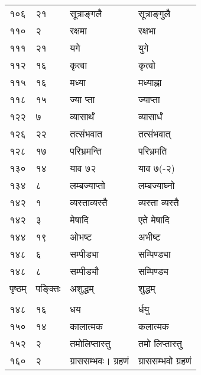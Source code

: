 \documentclass[11pt, openany]{book}
\begin{document}
\begin{longtable}{p{1cm} p{1.5cm} p{4cm} p{4cm}}
 १०६ & २१ & सूत्राङ्गलै & सूत्राङ्गुलै\\

 ११० & २ & रक्षमा & रक्षभा\\

 १११ & २१ & यगे & युगे \\

 ११२ & १६ & कृत्वा & कृत्वो\\

 ११५ & १६ & मध्या & मध्याह्ना\\

 ११८ & १५ & ज्या प्ता & ज्याप्ता\\

 १२२ &  ७ & व्यासार्थं & व्यासार्धं\\

 १२६ & २२ & तत्संभवात & तत्संभवात् \\

 १२८ & १७ & परिभ्रमन्ति & परिभ्रमति \\

 १३० & १४ & याव ७२ & याव ७(-२)\\

 १३४ & ८ & लम्बज्याप्तो & लम्बज्याघ्नो\\

 १४२ & १ & व्यस्ताव्यस्तै & व्यस्ता व्यस्तै\\

 १४२ & ३ & मेषादि & एते मेषादि \\

 १४४ & १९ & ओभष्ट & अभीष्ट\\

 १४८ & ६ & सम्पीड्या & सम्पिण्ड्या \\

 १४८ & ८ & सम्पीड्यौ & सम्पिण्ड्य\\

\newpage



पृष्ठम् & पङ्क्तिः &  अशुद्धम् & शुद्धम्\\
\vspace{2mm}\\

 १४८ & १६ & धय & र्धयु \\

 १५० & १४ & कालात्मक & कलात्मक \\

 १५२ & २ & तमोलिप्तास्तु & तमो लिप्तास्तु \\

 १६० & २ & ग्राससम्भवः। ग्रहणं & ग्राससम्भवो ग्रहणं \\


\end{longtable}
\end{document}
